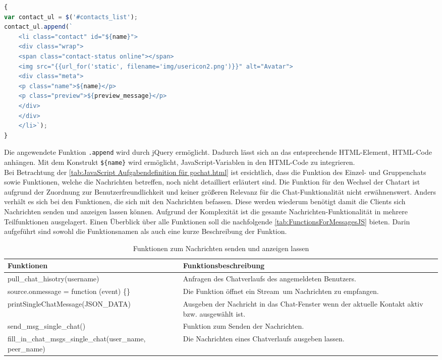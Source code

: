 \documentclass[a4paper,titlepage,halfparskip,12pt]{scrreprt}
\begin{document}
\begin{onehalfspacing}
\begin{lstlisting}[language=Javascript,caption=Hinzufügen des Kontaktes mithilfe von HTML-Elementen,label={lst:AddContacttoList}]
{
var contact_ul = $('#contacts_list');
contact_ul.append(`
	<li class="contact" id="${name}">
	<div class="wrap">
	<span class="contact-status online"></span>
	<img src="{{url_for('static', filename='img/usericon2.png')}}" alt="Avatar">
	<div class="meta">
	<p class="name">${name}</p>
	<p class="preview">${preview_message}</p>
	</div>
	</div>
	</li>`);
}
\end{lstlisting}  
Die angewendete Funktion \texttt{.append} wird durch jQuery ermöglicht. Dadurch lässt sich an das entsprechende HTML-Element, HTML-Code anhängen. Mit dem Konstrukt \texttt{\$\{name\}} wird ermöglicht, JavaScript-Variablen in den HTML-Code zu integrieren.\\ 
Bei Betrachtung der \autoref{tab:JavaScript Aufgabendefinition für gochat.html} ist ersichtlich, dass die Funktion des Einzel- und Gruppenchats sowie Funktionen, welche die Nachrichten betreffen, noch nicht detailliert erläutert sind. Die Funktion für den Wechsel der Chatart ist aufgrund der Zuordnung zur Benutzerfreundlichkeit und keiner größeren Relevanz für die Chat-Funktionalität nicht erwähnenswert. Anders verhält es sich bei den Funktionen, die sich mit den Nachrichten befassen. Diese werden wiederum benötigt damit die Clients sich Nachrichten senden und anzeigen lassen können. Aufgrund der Komplexität ist die gesamte Nachrichten-Funktionalität in mehrere Teilfunktionen ausgelagert. Einen Überblick über alle Funktionen soll die nachfolgende \autoref{tab:FunctionsForMessagesJS} bieten. Darin aufgeführt sind sowohl die Funktionsnamen als auch eine kurze Beschreibung der Funktion.
\begin{table}[h]
	\centering
	\caption{Funktionen zum Nachrichten senden und anzeigen lassen}
	\begin{tabular}{|p{6cm}|p{8.8cm}|}
		\hline
		\textbf{Funktionen} & \textbf{Funktionsbeschreibung} \\
		\hline
		pull\_chat\_hisotry(username) & Anfragen des Chatverlaufs des angemeldeten Benutzers.\\
		\hline
		source.onmessage = function (event) \{\} & Die Funktion öffnet ein \glqq Stream\grqq\ um Nachrichten zu empfangen.\\
		\hline
		printSingleChatMessage\linebreak(JSON\_DATA) & Ausgeben der Nachricht in das Chat-Fenster wenn der aktuelle Kontakt aktiv bzw. ausgewählt ist.\\
		\hline
		send\_msg\_single\_chat() & Funktion zum Senden der Nachrichten.\\
		\hline
		fill\_in\_chat\_msgs\_single\_chat\linebreak(user\_name, peer\_name) & Die Nachrichten eines Chatverlaufs ausgeben lassen.\\
		\hline
	\end{tabular}
	\label{tab:FunctionsForMessagesJS}
\end{table}


\end{onehalfspacing}
\end{document}
